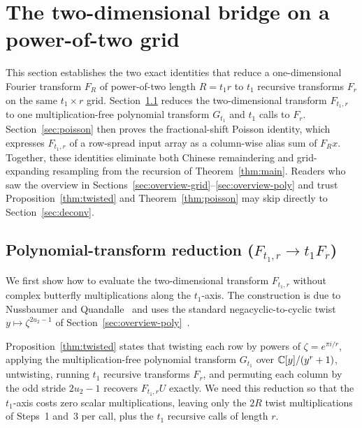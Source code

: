 \section{The two-dimensional bridge on a power-of-two grid}\label{sec:bridge}

This section establishes the two exact identities that reduce a one-dimensional Fourier transform $F_R$ of power-of-two length $R = t_1 r$ to $t_1$ recursive transforms $F_r$ on the same $t_1 \times r$ grid. Section~\ref{sec:twisted} reduces the two-dimensional transform $F_{t_1, r}$ to one multiplication-free polynomial transform $G_{t_1}$ and $t_1$ calls to $F_r$. Section~\ref{sec:poisson} then proves the fractional-shift Poisson identity, which expresses $F_{t_1, r}$ of a row-spread input array as a column-wise alias sum of $F_R x$. Together, these identities eliminate both Chinese remaindering and grid-expanding resampling from the recursion of Theorem~\ref{thm:main}. Readers who saw the overview in Sections~\ref{sec:overview-grid}--\ref{sec:overview-poly} and trust Proposition~\ref{thm:twisted} and Theorem~\ref{thm:poisson} may skip directly to Section~\ref{sec:deconv}.

\subsection{Polynomial-transform reduction (\texorpdfstring{$F_{t_1, r} \to t_1 F_r$}{F(t1, r) to t1 F(r)})}\label{sec:twisted}

We first show how to evaluate the two-dimensional transform $F_{t_1, r}$ without complex butterfly multiplications along the $t_1$-axis. The construction is due to Nussbaumer and Quandalle~\cite{NQ79,Nussbaumer82} and uses the standard negacyclic-to-cyclic twist $y \mapsto \zeta^{2u_2 - 1}$ of Section~\ref{sec:overview-poly}~\cite{SS71,CF94}.

Proposition~\ref{thm:twisted} states that twisting each row by powers of $\zeta = e^{\pi i / r}$, applying the multiplication-free polynomial transform $G_{t_1}$ over $\mathbb{C}[y]/(y^r + 1)$, untwisting, running $t_1$ recursive transforms $F_r$, and permuting each column by the odd stride $2u_2 - 1$ recovers $F_{t_1, r} U$ exactly. We need this reduction so that the $t_1$-axis costs zero scalar multiplications, leaving only the $2R$ twist multiplications of Steps~1 and~3 per call, plus the $t_1$ recursive calls of length $r$.


